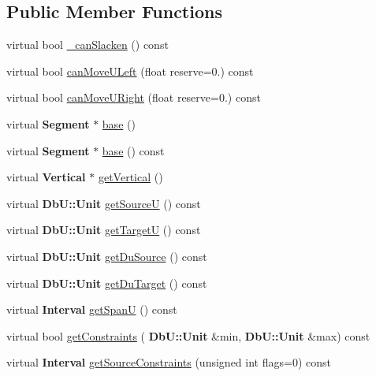 \subsection*{Public Member Functions}
\begin{DoxyCompactItemize}
\item 
virtual bool \hyperlink{classKatabatic_1_1AutoVertical_a2ced98fb06f208aa88c0962a706e64db}{\+\_\+can\+Slacken} () const
\item 
virtual bool \hyperlink{classKatabatic_1_1AutoVertical_a9b0c21eeb26c256876592ba63438da74}{can\+Move\+U\+Left} (float reserve=0.) const
\item 
virtual bool \hyperlink{classKatabatic_1_1AutoVertical_ad0c972e34d6bac47bd9276a7d6e053d8}{can\+Move\+U\+Right} (float reserve=0.) const
\item 
virtual \textbf{ Segment} $\ast$ \hyperlink{classKatabatic_1_1AutoVertical_a9e651c17b47f82166a02865c9296a2df}{base} ()
\item 
virtual \textbf{ Segment} $\ast$ \hyperlink{classKatabatic_1_1AutoVertical_a6f14a3faa93f2c610ea0d2cc7d903706}{base} () const
\item 
virtual \textbf{ Vertical} $\ast$ \hyperlink{classKatabatic_1_1AutoVertical_ab6a809b6f3ef3cf5385fa35580e31e7a}{get\+Vertical} ()
\item 
virtual \textbf{ Db\+U\+::\+Unit} \hyperlink{classKatabatic_1_1AutoVertical_ad521ffba761b0e81b7b81b99d62f76f9}{get\+SourceU} () const
\item 
virtual \textbf{ Db\+U\+::\+Unit} \hyperlink{classKatabatic_1_1AutoVertical_a4d52a506cd19dfa8e22e1dc0695bd960}{get\+TargetU} () const
\item 
virtual \textbf{ Db\+U\+::\+Unit} \hyperlink{classKatabatic_1_1AutoVertical_a760500b1fd027c71f5362dd8c0b01ea7}{get\+Du\+Source} () const
\item 
virtual \textbf{ Db\+U\+::\+Unit} \hyperlink{classKatabatic_1_1AutoVertical_a76e349c14c904b3300a15caa1ee8b680}{get\+Du\+Target} () const
\item 
virtual \textbf{ Interval} \hyperlink{classKatabatic_1_1AutoVertical_a0b5ac47ab175815e1a9bc07f2517614a}{get\+SpanU} () const
\item 
virtual bool \hyperlink{classKatabatic_1_1AutoVertical_a16737e7f2b77f8595fd2b607fac0f2f5}{get\+Constraints} (\textbf{ Db\+U\+::\+Unit} \&min, \textbf{ Db\+U\+::\+Unit} \&max) const
\item 
virtual \textbf{ Interval} \hyperlink{classKatabatic_1_1AutoVertical_a3239751f475bc65adb9d56f6c771ebb0}{get\+Source\+Constraints} (unsigned int flags=0) const

\end{DoxyCompactItemize}
